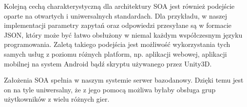 Kolejną cechą charakterystyczną dla architektury SOA jest również podejście oparte na otwartych i uniwersalnych standardach. Dla przykładu, w naszej implementacji parametry zapytań oraz odpowiedzi przesyłane są w formacie JSON, który może być łatwo obsłużony w niemal każdym współczesnym języku programowania. Zaletą takiego podejścia jest możliwość wykorzystania tych samych usług z poziomu różnych platform, np. aplikacji webowej, aplikacji mobilnej na system Android bądź skryptu używanego przez Unity3D.

Założenia SOA spełnia w naszym systemie serwer bazodanowy. Dzięki temu jest on na tyle uniwersalny, że z jego pomocą możliwa byłaby obsługa grup użytkowników z wielu różnych gier.